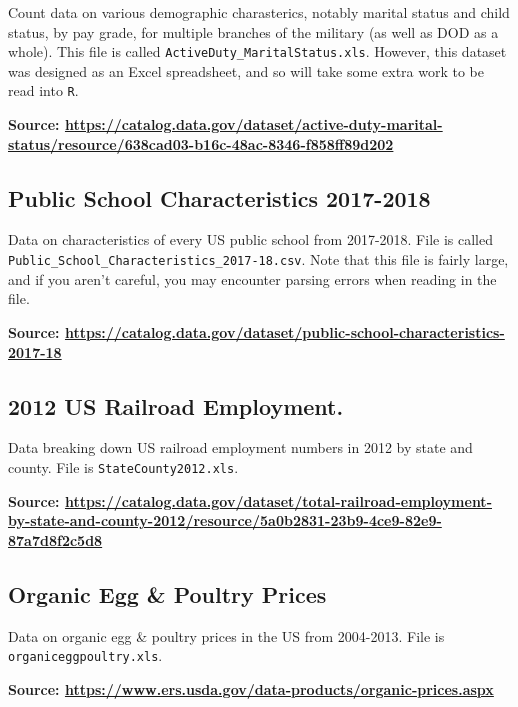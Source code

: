 \documentclass[
]{article}
\begin{document}
Count data on various demographic charasterics, notably marital status
and child status, by pay grade, for multiple branches of the military
(as well as DOD as a whole). This file is called
\texttt{ActiveDuty\_MaritalStatus.xls}. However, this dataset was
designed as an Excel spreadsheet, and so will take some extra work to be
read into \texttt{R}.

\textbf{Source:
\url{https://catalog.data.gov/dataset/active-duty-marital-status/resource/638cad03-b16c-48ac-8346-f858ff89d202}}

\hypertarget{public-school-characteristics-2017-2018}{%
\subsection{Public School Characteristics
2017-2018}\label{public-school-characteristics-2017-2018}}

Data on characteristics of every US public school from 2017-2018. File
is called \texttt{Public\_School\_Characteristics\_2017-18.csv}. Note
that this file is fairly large, and if you aren't careful, you may
encounter parsing errors when reading in the file.

\textbf{Source:
\url{https://catalog.data.gov/dataset/public-school-characteristics-2017-18}}

\hypertarget{us-railroad-employment.}{%
\subsection{2012 US Railroad
Employment.}\label{us-railroad-employment.}}

Data breaking down US railroad employment numbers in 2012 by state and
county. File is \texttt{StateCounty2012.xls}.

\textbf{Source:
\url{https://catalog.data.gov/dataset/total-railroad-employment-by-state-and-county-2012/resource/5a0b2831-23b9-4ce9-82e9-87a7d8f2c5d8}}

\hypertarget{organic-egg-poultry-prices}{%
\subsection{Organic Egg \& Poultry
Prices}\label{organic-egg-poultry-prices}}

Data on organic egg \& poultry prices in the US from 2004-2013. File is
\texttt{organiceggpoultry.xls}.

\textbf{Source:
\url{https://www.ers.usda.gov/data-products/organic-prices.aspx}}
\end{document}
